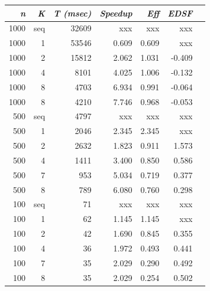 \documentclass{dependencies/acm_proc_article-sp}
\begin{document}
\begin{center}
\begin{tabular}{|r|r|r|r|r|r|r|}\hline
{\em n} & {\em K} & {\em T (msec)} & {\em Speedup} & {\em Eff} & {\em EDSF} \\\hline
1000    & seq     &   32609        &   xxx         & xxx       & xxx        \\\hline
1000    & 1       &   53546        & 0.609        & 0.609    & xxx        \\\hline
1000    & 2       &   15812        & 2.062        & 1.031    & -0.409     \\\hline
1000    & 4       &    8101        & 4.025        & 1.006    & -0.132     \\\hline
1000    & 8       &    4703        & 6.934        & 0.991    & -0.064     \\\hline
1000    & 8       &    4210        & 7.746        & 0.968    & -0.053     \\\hline
500     & seq     &    4797        &   xxx         & xxx       & xxx        \\\hline
500     & 1       &    2046        & 2.345         & 2.345     & xxx        \\\hline
500     & 2       &    2632        & 1.823         & 0.911      & 1.573      \\\hline
500     & 4       &    1411        & 3.400         & 0.850     & 0.586      \\\hline
500     & 7       &     953        & 5.034         & 0.719     & 0.377      \\\hline
500     & 8       &     789        & 6.080         & 0.760     & 0.298      \\\hline
100     & seq     &      71        &   xxx         & xxx       & xxx        \\\hline
100     & 1       &      62        & 1.145        & 1.145    & xxx        \\\hline
100     & 2       &      42        & 1.690        & 0.845    & 0.355     \\\hline
100     & 4       &      36        & 1.972        & 0.493    & 0.441     \\\hline
100     & 7       &      35        & 2.029        & 0.290    & 0.492     \\\hline
100     & 8       &      35        & 2.029        & 0.254    & 0.502     \\\hline
\end{tabular}
\end{center}
\end{document}
